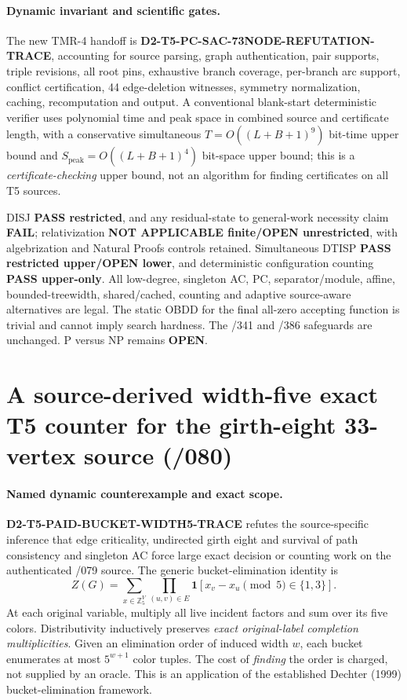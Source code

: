 \documentclass[11pt]{article}
\begin{document}
\paragraph{Dynamic invariant and scientific gates.}
The new TMR-4 handoff is
\textbf{D2-T5-PC-SAC-73NODE-REFUTATION-TRACE}, accounting
for source parsing, graph authentication, pair supports,
triple revisions, all root pins, exhaustive branch coverage,
per-branch arc support, conflict certification, 44 edge-deletion
witnesses, symmetry normalization, caching, recomputation and
output. A conventional blank-start deterministic verifier uses
polynomial time and peak space in combined source and
certificate length, with a conservative simultaneous
$T=O((L+B+1)^9)$ bit-time upper bound and
$S_{\mathrm{peak}}=O((L+B+1)^4)$ bit-space upper bound;
this is a \emph{certificate-checking} upper bound, not an
algorithm for finding certificates on all T5 sources.

DISJ \textbf{PASS restricted}, and any residual-state to
general-work necessity claim \textbf{FAIL}; relativization
\textbf{NOT APPLICABLE finite/OPEN unrestricted}, with
algebrization and Natural Proofs controls retained.
Simultaneous DTISP \textbf{PASS restricted upper/OPEN lower},
and deterministic configuration counting
\textbf{PASS upper-only}. All low-degree, singleton AC, PC,
separator/module, affine, bounded-treewidth, shared/cached,
counting and adaptive source-aware alternatives are legal.
The static OBDD for the final all-zero accepting function is
trivial and cannot imply search hardness.
The /341 and /386 safeguards are unchanged.
P versus NP remains \textbf{OPEN}.

\section{A source-derived width-five exact T5 counter for the girth-eight 33-vertex source (/080)}
\paragraph{Named dynamic counterexample and exact scope.}
\textbf{D2-T5-PAID-BUCKET-WIDTH5-TRACE} refutes the
source-specific inference that edge criticality, undirected girth eight
and survival of path consistency and singleton AC force large exact
decision or counting work on the authenticated /079 source.
The generic bucket-elimination identity is
\[
Z(G)=\sum_{x\in\mathbb Z_5^V}
  \prod_{(u,v)\in E}\mathbf 1[x_v-x_u\pmod 5\in\{1,3\}].
\]
At each original variable, multiply all live incident factors and
sum over its five colors.  Distributivity inductively preserves
\emph{exact original-label completion multiplicities}.  Given an
elimination order of induced width $w$, each bucket enumerates at most
$5^{w+1}$ color tuples.  The cost of \emph{finding} the order is charged,
not supplied by an oracle.  This is an application of the established
Dechter (1999) bucket-elimination framework.
\end{document}
